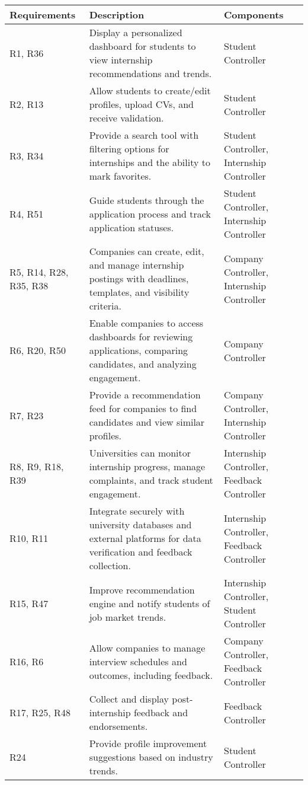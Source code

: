 \begin{longtable}{|p{3cm}|p{5cm}|p{4cm}|}
\hline
\textbf{Requirements} & \textbf{Description} & \textbf{Components} \\
\hline
R1, R36 & Display a personalized dashboard for students to view internship recommendations and trends. & Student Controller \\
\hline
R2, R13 & Allow students to create/edit profiles, upload CVs, and receive validation. & Student Controller \\
\hline
R3, R34 & Provide a search tool with filtering options for internships and the ability to mark favorites. & Student Controller, Internship Controller \\
\hline
R4, R51 & Guide students through the application process and track application statuses. & Student Controller, Internship Controller \\
\hline
R5, R14, R28, R35, R38 & Companies can create, edit, and manage internship postings with deadlines, templates, and visibility criteria. & Company Controller, Internship Controller \\
\hline
R6, R20, R50 & Enable companies to access dashboards for reviewing applications, comparing candidates, and analyzing engagement. & Company Controller \\
\hline
R7, R23 & Provide a recommendation feed for companies to find candidates and view similar profiles. & Company Controller, Internship Controller \\
\hline
R8, R9, R18, R39 & Universities can monitor internship progress, manage complaints, and track student engagement. & Internship Controller, Feedback Controller \\
\hline
R10, R11 & Integrate securely with university databases and external platforms for data verification and feedback collection. & Internship Controller, Feedback Controller \\
\hline
R15, R47 & Improve recommendation engine and notify students of job market trends. & Internship Controller, Student Controller \\
\hline
R16, R6 & Allow companies to manage interview schedules and outcomes, including feedback. & Company Controller, Feedback Controller \\
\hline
R17, R25, R48 & Collect and display post-internship feedback and endorsements. & Feedback Controller \\
\hline
R24 & Provide profile improvement suggestions based on industry trends. & Student Controller \\

\end{longtable}
